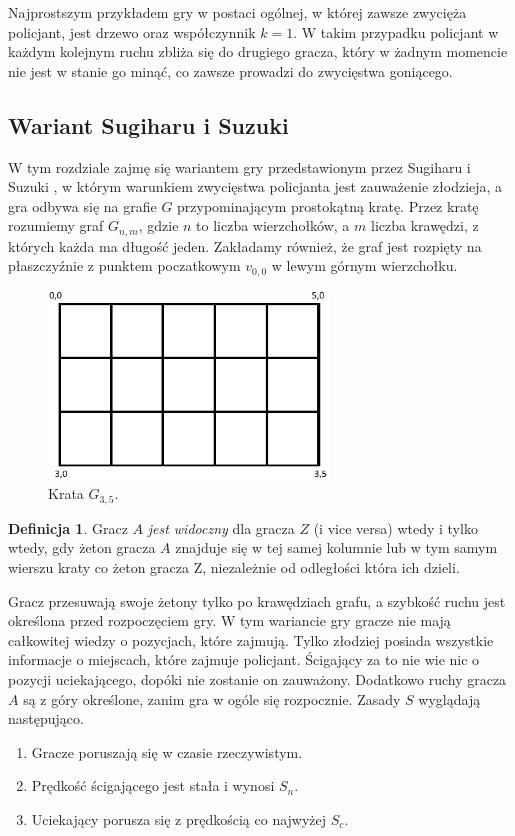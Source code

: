 \documentclass[brudnopis]{xmgr}
\theoremstyle{definition}
\newtheorem{Definicja}{Definicja}
\begin{document}
Najprostszym przykładem gry w postaci ogólnej, w której zawsze zwycięża policjant, jest drzewo oraz współczynnik $k = 1$. W takim przypadku policjant w każdym kolejnym ruchu zbliża się do drugiego gracza, który w żadnym momencie nie jest w stanie go minąć, co zawsze prowadzi do zwycięstwa goniącego.

\subsection{Wariant Sugiharu i Suzuki} \label{sugiharu}
W tym rozdziale zajmę się wariantem gry przedstawionym przez Sugiharu i Suzuki \cite{sugiharu}, w którym warunkiem zwycięstwa policjanta jest zauważenie złodzieja, a gra odbywa się na grafie $G$ przypominającym prostokątną kratę.
Przez kratę rozumiemy graf $G_{n,m}$, gdzie $n$ to liczba wierzchołków, a $m$ liczba krawędzi, z których każda ma długość jeden. Zakładamy również, że graf jest rozpięty na płaszczyźnie z punktem poczatkowym $v_{0,0}$ w lewym górnym wierzchołku. 
\begin{figure}[ht!]
   \centering
    \includegraphics[height=5cm]{rysunki/siatka_3_5.png}
    \caption{Krata $G_{3,5}$.}
\end{figure}

\begin{Definicja}
  Gracz $A$ \emph{jest widoczny} dla gracza $Z$ (i vice versa) wtedy i tylko wtedy, gdy żeton gracza $A$ znajduje się w tej samej kolumnie lub w tym samym wierszu kraty co żeton gracza Z, niezależnie od odległości która ich dzieli.
\end{Definicja}

Gracz przesuwają swoje żetony tylko po krawędziach grafu, a szybkość ruchu jest określona przed rozpoczęciem gry.
W tym wariancie gry gracze nie mają całkowitej wiedzy o pozycjach, które zajmują. Tylko złodziej posiada wszystkie informacje o miejscach, które zajmuje policjant. Ścigający za to nie wie nic o pozycji uciekającego, dopóki nie zostanie on zauważony. Dodatkowo ruchy gracza $A$ są z góry określone, zanim gra w ogóle się rozpocznie.
Zasady $S$ wyglądają następująco.
\begin{enumerate}
  \item Gracze poruszają się w czasie rzeczywistym.
  \item Prędkość ścigającego jest stała i wynosi $S_n$.
  \item Uciekający porusza się z prędkością co najwyżej $S_c$.
\end{enumerate}
\end{document}
